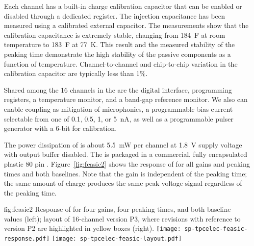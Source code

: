 Each   channel has a built-in charge calibration 
capacitor that can be enabled or disabled through a dedicated register. 
The injection capacitance has been measured using a calibrated external 
capacitor. The measurements show that the calibration capacitance is 
extremely stable, changing from \SI{184}{F} at room temperature to 
\SI{183}{F} at \SI{77}{K}. This result and the measured stability of 
the peaking time demonstrate the high stability of the passive 
components as a function of temperature. Channel-to-channel and 
chip-to-chip variation in the calibration capacitor are typically 
less than \num{1}\%.

Shared among the \num{16} channels in the   are 
the digital interface, programming registers, a temperature monitor, 
and a band-gap reference monitor. We also can enable  
coupling as mitigation of microphonics, a programmable bias current 
selectable from one of \num{0.1}, \num{0.5}, \num{1}, or \SI{5}{nA}, 
as well as a programmable pulser generator with a \num{6}-bit 
 for calibration. 

The power dissipation of   is about \SI{5.5}{mW} 
per channel at \SI{1.8}{V} supply voltage with output buffer disabled. 
The  is packaged in a commercial, fully encapsulated 
plastic \num{80} pin . Figure~\ref{fig:feasic2} shows the 
response of   for all gains and peaking times 
and both baselines. Note that the gain is independent of the peaking 
time; the same amount of charge produces the same peak voltage signal 
regardless of the peaking time.

\begin{dunefigure}
{fig:feasic2}
{Response of   for four gains, four peaking times, 
and both baseline values (left); layout of \num{16}-channel  
 version P3, where revisions with reference to version 
P2 are highlighted in yellow boxes (right).}
\texttt{[image: sp-tpcelec-feasic-response.pdf]}
\hspace{6mm}
\texttt{[image: sp-tpcelec-feasic-layout.pdf]}
\end{dunefigure}

